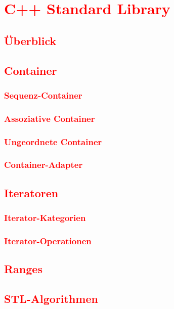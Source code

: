 \chapter{\textcolor{red}{C++ Standard Library}}\label{chap:standard-library}
\section{\textcolor{red}{Überblick}}\label{sec:std-lib-overview}
\section{\textcolor{red}{Container}}\label{sec:std-containers}
\subsection{\textcolor{red}{Sequenz-Container}}\label{sec:sequence-containers}
\subsection{\textcolor{red}{Assoziative Container}}\label{sec:associative-containers}
\subsection{\textcolor{red}{Ungeordnete Container}}\label{sec:unordered-containers}
\subsection{\textcolor{red}{Container-Adapter}}\label{sec:container-adapters}
\section{\textcolor{red}{Iteratoren}}\label{sec:iterators}
\subsection{\textcolor{red}{Iterator-Kategorien}}\label{sec:iterator-categories}
\subsection{\textcolor{red}{Iterator-Operationen}}\label{sec:iterator-operations}
\section{\textcolor{red}{Ranges}}\label{sec:ranges}
\section{\textcolor{red}{STL-Algorithmen}}\label{sec:stl-algorithms}
